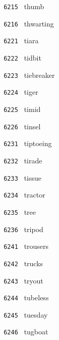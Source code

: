 \documentclass[11pt]{article}
\begin{document}
\begin{multicols}{6}
\noindent \texttt{ 6215 } \hspace{1mm} thumb  \par
\noindent \texttt{ 6216 } \hspace{1mm} thwarting  \par
\noindent \texttt{ 6221 } \hspace{1mm} tiara  \par
\noindent \texttt{ 6222 } \hspace{1mm} tidbit  \par
\noindent \texttt{ 6223 } \hspace{1mm} tiebreaker  \par
\noindent \texttt{ 6224 } \hspace{1mm} tiger  \par
\noindent \texttt{ 6225 } \hspace{1mm} timid  \par
\noindent \texttt{ 6226 } \hspace{1mm} tinsel  \par
\noindent \texttt{ 6231 } \hspace{1mm} tiptoeing  \par
\noindent \texttt{ 6232 } \hspace{1mm} tirade  \par
\noindent \texttt{ 6233 } \hspace{1mm} tissue  \par
\noindent \texttt{ 6234 } \hspace{1mm} tractor  \par
\noindent \texttt{ 6235 } \hspace{1mm} tree  \par
\noindent \texttt{ 6236 } \hspace{1mm} tripod  \par
\noindent \texttt{ 6241 } \hspace{1mm} trousers  \par
\noindent \texttt{ 6242 } \hspace{1mm} trucks  \par
\noindent \texttt{ 6243 } \hspace{1mm} tryout  \par
\noindent \texttt{ 6244 } \hspace{1mm} tubeless  \par
\noindent \texttt{ 6245 } \hspace{1mm} tuesday  \par
\noindent \texttt{ 6246 } \hspace{1mm} tugboat  \par

\end{multicols}
\end{document}
